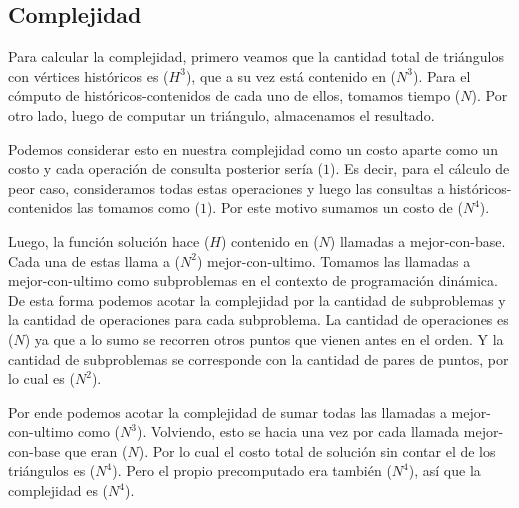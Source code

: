 \subsection{Complejidad}
\par{Para calcular la complejidad, primero veamos que la cantidad total de triángulos con vértices históricos es \bigo($H^3$), que a su vez está contenido en \bigo($N^3$). Para el cómputo de históricos-contenidos de cada uno de ellos, tomamos tiempo \bigo($N$). Por otro lado, luego de computar un triángulo, almacenamos el resultado. } \newline
\par{
Podemos considerar esto en nuestra complejidad como un costo aparte como un costo  y cada operación de consulta posterior sería \bigo($1$). Es decir, para el cálculo de peor caso, consideramos todas estas operaciones y luego las consultas a históricos-contenidos las tomamos como \bigo($1$). Por este motivo sumamos un costo de \bigo($N^4$).} \newline
\par{
Luego, la función solución hace \bigo($H$) contenido en \bigo($N$) llamadas a mejor-con-base.
Cada una de estas llama a \bigo($N^2$) mejor-con-ultimo. Tomamos las llamadas a mejor-con-ultimo como subproblemas en el contexto de programación dinámica. De esta forma podemos acotar la complejidad por la cantidad de subproblemas y la cantidad de operaciones para cada subproblema. La cantidad de operaciones es \bigo($N$) ya que a lo sumo se recorren otros puntos que vienen antes en el orden. Y la cantidad de subproblemas se corresponde con la cantidad de pares de puntos, por lo cual es \bigo($N^2$).} \newline
\par{Por ende podemos acotar la complejidad de sumar todas las llamadas a mejor-con-ultimo como \bigo($N^3$). Volviendo, esto se hacia una vez por cada llamada mejor-con-base que eran \bigo($N$). Por lo cual el costo total de solución sin contar el  de los triángulos es \bigo($N^4$). Pero el propio precomputado era también \bigo($N^4$), así que la complejidad es \bigo($N^4$).} \newline